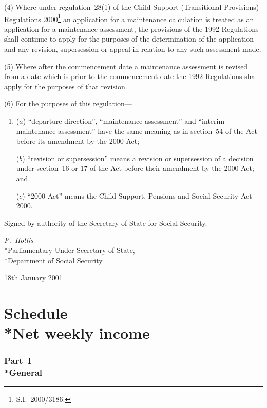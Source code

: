 \documentclass[12pt,a4paper]{article}
\begin{document}
(4) Where under regulation~28(1) of the Child Support (Transitional Provisions) Regulations 2000\footnote{S.I.~2000/3186.} an application for a maintenance calculation is treated as an application for a maintenance assessment, the provisions of the 1992 Regulations shall continue to apply for the purposes of the determination of the application and any revision, supersession or appeal in relation to any such assessment made.

(5) Where after the commencement date a maintenance assessment is revised from a date which is prior to the commencement date the 1992 Regulations shall apply for the purposes of that revision.

(6) For the purposes of this regulation—
\begin{enumerate}\item[]
($a$) “departure direction”, “maintenance assessment” and “interim maintenance assessment” have the same meaning as in section~54 of the Act before its amendment by the 2000 Act;

($b$) “revision or supersession” means a revision or supersession of a decision under section~16 or 17 of the Act before their amendment by the 2000 Act; and

($c$) “2000 Act” means the Child Support, Pensions and Social Security Act 2000.
\end{enumerate}


\bigskip

Signed 
by authority of the Secretary of State for Social Security.

{\raggedleft
\emph{P.~Hollis}\\*Parliamentary Under-Secretary of State,\\*Department of Social Security

}

18th January 2001

\small

\part[Schedule~--- Net weekly income]{Schedule\\*Net weekly income}

\section[Part~I --- General]{Part~I\\*General}
\end{document}
